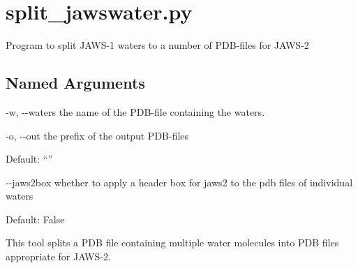 \documentclass[letterpaper,10pt,english]{sphinxmanual}
\begin{document}
\section{split\_jawswater.py}
\label{\detokenize{tools:split-jawswater-py}}

Program to split JAWS-1 waters to a number of PDB-files for JAWS-2


%
\begin{sphinxVerbatim}[commandchars=\\\{\}]
  \PYG{p}{[}\PYG{p}{]} \PYG{p}{[} \PYG{p}{]} \PYG{p}{[} \PYG{p}{]} \PYG{p}{[}\PYG{p}{]}
\end{sphinxVerbatim}


\subsection{Named Arguments}
\label{\detokenize{tools:Named Arguments}}\begin{optionlist}{3cm}
\item [-w, -{-}waters]  
the name of the PDB-file containing the waters.
\item [-o, -{-}out]  
the prefix of the output PDB-files

Default: “”
\item [-{-}jaws2box]  
whether to apply a header box for jaws2 to the pdb files of individual waters

Default: False
\end{optionlist}


%
\begin{sphinxVerbatim}[commandchars=\\\{\}]
  
    
\end{sphinxVerbatim}


This tool splits a PDB file containing multiple water molecules into PDB files appropriate for JAWS-2.
\end{document}

